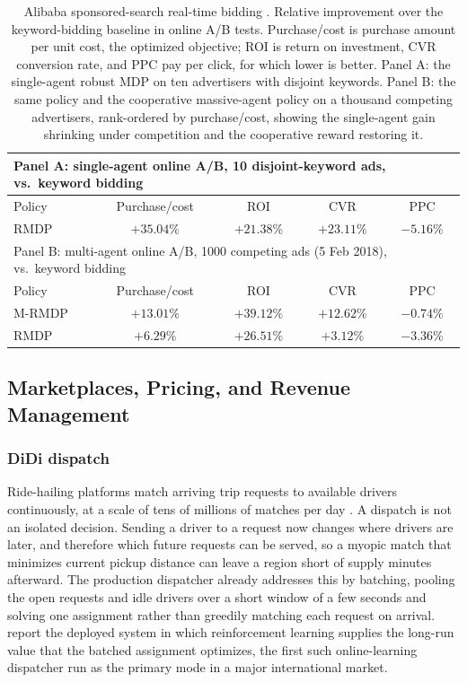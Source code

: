 \begin{table}[t]
\centering
\small
\begin{tabular}{lcccc}
\toprule
\multicolumn{5}{l}{Panel A: single-agent online A/B, 10 disjoint-keyword ads, vs.\ keyword bidding} \\
\midrule
Policy & Purchase/cost & ROI & CVR & PPC \\
\midrule
RMDP & $+35.04\%$ & $+21.38\%$ & $+23.11\%$ & $-5.16\%$ \\
\midrule
\multicolumn{5}{l}{Panel B: multi-agent online A/B, 1000 competing ads (5 Feb 2018), vs.\ keyword bidding} \\
\midrule
Policy & Purchase/cost & ROI & CVR & PPC \\
\midrule
M-RMDP & $+13.01\%$ & $+39.12\%$ & $+12.62\%$ & $-0.74\%$ \\
RMDP & $+6.29\%$ & $+26.51\%$ & $+3.12\%$ & $-3.36\%$ \\
\bottomrule
\end{tabular}
\caption{Alibaba sponsored-search real-time bidding \citep{Zhao2018SponsoredSearchRTB}. Relative improvement over the keyword-bidding baseline in online A/B tests. Purchase/cost is purchase amount per unit cost, the optimized objective; ROI is return on investment, CVR conversion rate, and PPC pay per click, for which lower is better. Panel A: the single-agent robust MDP on ten advertisers with disjoint keywords. Panel B: the same policy and the cooperative massive-agent policy on a thousand competing advertisers, rank-ordered by purchase/cost, showing the single-agent gain shrinking under competition and the cooperative reward restoring it.}
\label{tab:alibaba_rtb}
\end{table}

\subsection{Marketplaces, Pricing, and Revenue Management}

\subsubsection{DiDi dispatch}
Ride-hailing platforms match arriving trip requests to available drivers continuously, at a scale of tens of millions of matches per day \citep{Qin2021dispatch}. A dispatch is not an isolated decision. Sending a driver to a request now changes where drivers are later, and therefore which future requests can be served, so a myopic match that minimizes current pickup distance can leave a region short of supply minutes afterward. The production dispatcher already addresses this by batching, pooling the open requests and idle drivers over a short window of a few seconds and solving one assignment rather than greedily matching each request on arrival. \citet{SadeghiEshkevari2022DiDiScalable} report the deployed system in which reinforcement learning supplies the long-run value that the batched assignment optimizes, the first such online-learning dispatcher run as the primary mode in a major international market.

